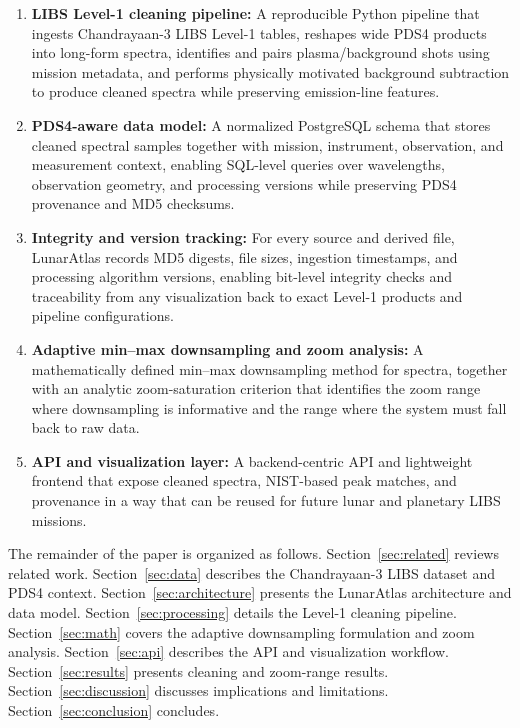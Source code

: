 \documentclass[12pt,a4paper]{article}
\begin{document}
\begin{enumerate}[label=(C\arabic*),leftmargin=2em]
  \item \textbf{LIBS Level-1 cleaning pipeline:} A reproducible Python pipeline that ingests Chandrayaan-3 LIBS Level-1 tables, reshapes wide PDS4 products into long-form spectra, identifies and pairs plasma/background shots using mission metadata, and performs physically motivated background subtraction to produce cleaned spectra while preserving emission-line features.
  \item \textbf{PDS4-aware data model:} A normalized PostgreSQL schema that stores cleaned spectral samples together with mission, instrument, observation, and measurement context, enabling SQL-level queries over wavelengths, observation geometry, and processing versions while preserving PDS4 provenance and MD5 checksums.
  \item \textbf{Integrity and version tracking:} For every source and derived file, LunarAtlas records MD5 digests, file sizes, ingestion timestamps, and processing algorithm versions, enabling bit-level integrity checks and traceability from any visualization back to exact Level-1 products and pipeline configurations.
  \item \textbf{Adaptive min--max downsampling and zoom analysis:} A mathematically defined min--max downsampling method for spectra, together with an analytic zoom-saturation criterion that identifies the zoom range where downsampling is informative and the range where the system must fall back to raw data.
  \item \textbf{API and visualization layer:} A backend-centric API and lightweight frontend that expose cleaned spectra, NIST-based peak matches, and provenance in a way that can be reused for future lunar and planetary LIBS missions.
\end{enumerate}

The remainder of the paper is organized as follows. Section~\ref{sec:related} reviews related work. Section~\ref{sec:data} describes the Chandrayaan-3 LIBS dataset and PDS4 context. Section~\ref{sec:architecture} presents the LunarAtlas architecture and data model. Section~\ref{sec:processing} details the Level-1 cleaning pipeline. Section~\ref{sec:math} covers the adaptive downsampling formulation and zoom analysis. Section~\ref{sec:api} describes the API and visualization workflow. Section~\ref{sec:results} presents cleaning and zoom-range results. Section~\ref{sec:discussion} discusses implications and limitations. Section~\ref{sec:conclusion} concludes.
\end{document}

